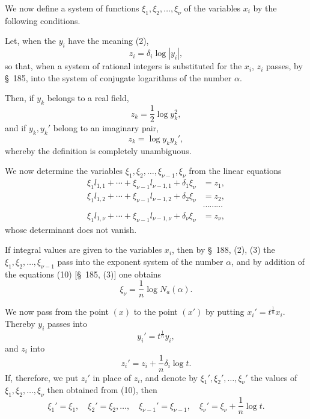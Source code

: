 \documentclass[11pt]{article}
\newcommand{\Na}{N_a}
\begin{document}
We now define a system of functions $\xi_1,\xi_2,\ldots,\xi_\nu$ of the variables $x_i$ by the following conditions.

Let, when the $y_i$ have the meaning (2),
\begin{equation}
z_i=\delta_i\log|y_i|,
\tag{7}
\end{equation}
so that, when a system of rational integers is substituted for the $x_i$, $z_i$ passes, by \S~185, into the system of conjugate logarithms of the number $\alpha$.

Then, if $y_k$ belongs to a real field,
\begin{equation}
z_k=\frac12\log y_k^2,
\tag{8}
\end{equation}
and if $y_k,y_k'$ belong to an imaginary pair,
\begin{equation}
z_k=\log y_ky_k',
\tag{9}
\end{equation}
whereby the definition is completely unambiguous.

We now determine the variables $\xi_1,\xi_2,\ldots,\xi_{\nu-1},\xi_\nu$ from the linear equations
\begin{equation}
\begin{aligned}
\xi_1l_{1,1}+\cdots+\xi_{\nu-1}l_{\nu-1,1}+\delta_1\xi_\nu&=z_1,\\
\xi_1l_{1,2}+\cdots+\xi_{\nu-1}l_{\nu-1,2}+\delta_2\xi_\nu&=z_2,\\
&\cdots\cdots\cdots\\
\xi_1l_{1,\nu}+\cdots+\xi_{\nu-1}l_{\nu-1,\nu}+\delta_\nu\xi_\nu&=z_\nu,
\end{aligned}
\tag{10}
\end{equation}
whose determinant does not vanish.

If integral values are given to the variables $x_i$, then by \S~188, (2), (3) the $\xi_1,\xi_2,\ldots,\xi_{\nu-1}$ pass into the exponent system of the number $\alpha$, and by addition of the equations (10) [\S~185, (3)] one obtains
\begin{equation}
\xi_\nu=\frac1n\log \Na(\alpha).
\tag{11}
\end{equation}

We now pass from the point $(x)$ to the point $(x')$ by putting $x_i'=t^{\frac1n}x_i$. Thereby $y_i$ passes into
\[
y_i'=t^{\frac1n}y_i,
\]
and $z_i$ into
\[
z_i'=z_i+\frac1n\delta_i\log t.
\]
If, therefore, we put $z_i'$ in place of $z_i$, and denote by $\xi_1',\xi_2',\ldots,\xi_\nu'$ the values of $\xi_1,\xi_2,\ldots,\xi_\nu$ then obtained from (10), then
\begin{equation}
\xi_1'=\xi_1,
\quad \xi_2'=\xi_2,
\ldots,
\quad \xi_{\nu-1}'=\xi_{\nu-1},
\quad \xi_\nu'=\xi_\nu+\frac1n\log t.
\tag{12}
\end{equation}
\end{document}
